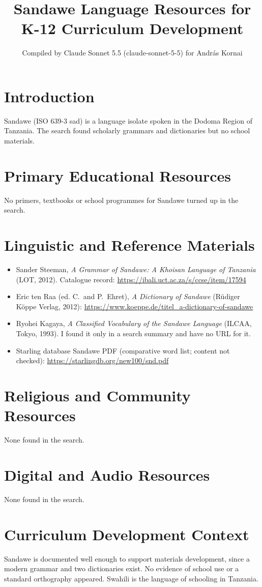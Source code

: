 \documentclass[12pt]{article}
\title{Sandawe Language Resources for K-12 Curriculum Development}
\author{Compiled by Claude Sonnet 5.5 (claude-sonnet-5-5) for Andr\'as Kornai}
\date{}
\begin{document}
\maketitle

\section{Introduction}
Sandawe (ISO 639-3 sad) is a language isolate spoken in the Dodoma Region of Tanzania. The search found scholarly grammars and dictionaries but no school materials.

\section{Primary Educational Resources}
No primers, textbooks or school programmes for Sandawe turned up in the search.

\section{Linguistic and Reference Materials}
\begin{itemize}
\item Sander Steeman, \emph{A Grammar of Sandawe: A Khoisan Language of Tanzania} (LOT, 2012). Catalogue record: \url{https://ibali.uct.ac.za/s/ccse/item/17594}
\item Eric ten Raa (ed. C.\ and P.\ Ehret), \emph{A Dictionary of Sandawe} (R\"udiger K\"oppe Verlag, 2012): \url{https://www.koeppe.de/titel_a-dictionary-of-sandawe}
\item Ryohei Kagaya, \emph{A Classified Vocabulary of the Sandawe Language} (ILCAA, Tokyo, 1993). I found it only in a search summary and have no URL for it.
\item Starling database Sandawe PDF (comparative word list; content not checked): \url{https://starlingdb.org/new100/snd.pdf}
\end{itemize}

\section{Religious and Community Resources}
None found in the search.

\section{Digital and Audio Resources}
None found in the search.

\section{Curriculum Development Context}
Sandawe is documented well enough to support materials development, since a modern grammar and two dictionaries exist. No evidence of school use or a standard orthography appeared. Swahili is the language of schooling in Tanzania.
\end{document}
